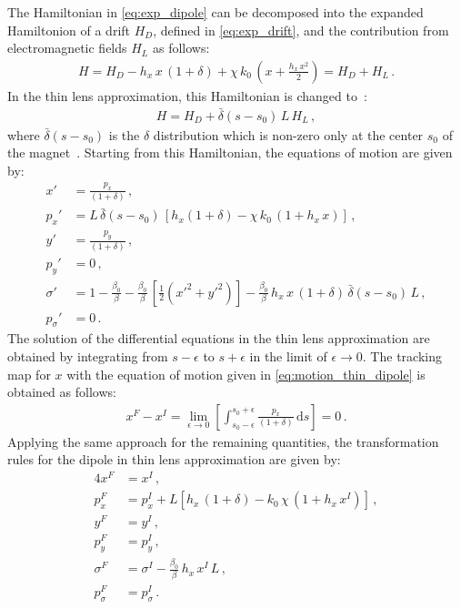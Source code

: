 The Hamiltonian in \eqref{eq:exp_dipole} can be decomposed into the expanded Hamiltonion of a drift $H_D$, defined in \eqref{eq:exp_drift}, and the contribution from electromagnetic fields $H_L$ as follows:
%
\begin{align}
  H = H_D - h_x \, x \, (1+\delta) + \chi \, k_0 \, \left(x + \frac{h_x \, x^2}{2} \right) = H_D + H_L \, .
\end{align}
%
In the thin lens approximation, this Hamiltonian is changed to~\cite{DESY-95-189}:
%
\begin{align}
 H = H_D + \bar{\delta}(s-s_0) \, L \, H_L \, , \label{eq:thin_H}
\end{align}
%
where $\bar{\delta}(s-s_0)$ is the $\delta$ distribution which is non-zero only at the center $s_0$ of the magnet~\cite{dirac:1958}. 
%
Starting from this Hamiltonian, the equations of motion are given by:
\begin{align}
  x'    &= \frac{p_x}{(1+\delta)} \, , \label{eq:motion_thin_dipole}\\
  p_x'  &= L \, \bar{\delta}(s-s_0) \, \left[ h_x (1+\delta) - \chi \, k_0 \, (1+h_x \, x)  \right] \, ,\\
  y'    &= \frac{p_y}{(1+\delta)} \, ,\\
  p_y'  &= 0 \, , \\
  \sigma' &= 1 - \frac{\beta_0}{\beta} - \frac{\beta_0}{\beta} \, \left[ \frac{1}{2} \left(x'^2 + y'^2\right) \right] - \frac{\beta_0}{\beta} \, h_x \, x \, (1+\delta) \, \bar{\delta}(s-s_0) \, L \, , \\
  p_\sigma ' &= 0 \, .
\end{align}
%
The solution of the differential equations in the thin lens approximation are obtained by integrating from $s-\epsilon$ to $s+\epsilon$ in the limit of $\epsilon \rightarrow 0$. The tracking map for $x$ with the equation of motion given in \eqref{eq:motion_thin_dipole} is obtained as follows:
%
\begin{align}
  x^F - x^I = \lim_{\epsilon \rightarrow 0} \left[ \int_{s_0 - \epsilon}^{s_0+\epsilon} \frac{p_x}{(1+\delta)} \, \mathrm{d}s \right] = 0 \, .
\end{align}
%
Applying the same approach for the remaining quantities, the transformation rules for the dipole in thin lens approximation are given by:
\begin{alignat}{4}
x^F &= x^I \, , \label{eq:thindip01} \\ 
p_x^F &= p_x^I + L \left[ h_x \, (1+\delta) - k_0 \, \chi \, (1 + h_x \, x^I)  \right]\, \label{eq:thindipolekick} ,\\ 
y^F &= y^I \, , \\
p_y^F &= p_y^I\, ,\\ 
\sigma^F &= \sigma^I - \frac{\beta_0}{\beta} \, h_x \, x^I \, L \, , \\
p_\sigma^F & = p_\sigma^I \, \label{eq:thindip02} .
\end{alignat}
